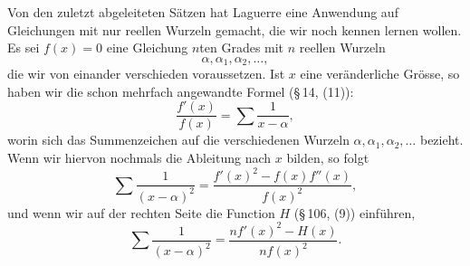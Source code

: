 \documentclass[11pt]{article}
\begin{document}
Von den zuletzt abgeleiteten Sätzen hat Laguerre eine Anwendung auf Gleichungen mit nur reellen Wurzeln gemacht, die wir noch kennen lernen wollen. Es sei $f(x)=0$ eine Gleichung $n$ten Grades mit $n$ reellen Wurzeln
\[
        \alpha,\alpha_1,\alpha_2,\ldots,
\]
die wir von einander verschieden voraussetzen. Ist $x$ eine veränderliche Grösse, so haben wir die schon mehrfach angewandte Formel (\S\,14, (11)):
\begin{equation}
        \frac{f'(x)}{f(x)}=\sum\frac1{x-\alpha},
\tag{1}
\end{equation}
worin sich das Summenzeichen auf die verschiedenen Wurzeln $\alpha,\alpha_1,\alpha_2,\ldots$ bezieht. Wenn wir hiervon nochmals die Ableitung nach $x$ bilden, so folgt
\begin{equation}
        \sum\frac1{(x-\alpha)^2}
        =\frac{f'(x)^2-f(x)f''(x)}{f(x)^2},
\tag{2}
\end{equation}
und wenn wir auf der rechten Seite die Function $H$ (\S\,106, (9)) einführen,
\begin{equation}
        \sum\frac1{(x-\alpha)^2}
        =\frac{n f'(x)^2-H(x)}{n f(x)^2}.
\tag{3}
\end{equation}
\end{document}
